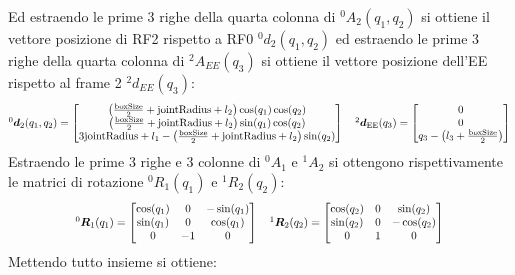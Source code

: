 ﻿\documentclass[11pt, a4paper]{article}
\begin{document}
Ed estraendo le prime 3 righe della quarta colonna di ${}^{0}A_{2}(q_{1}, q_{2})$ si ottiene il vettore posizione di RF2 rispetto a RF0 ${}^{0}d_{2}(q_1, q_2)$ ed estraendo le prime 3 righe della quarta colonna di ${}^{2}A_{EE}(q_{3})$ si ottiene il vettore posizione dell'EE rispetto al frame 2 ${}^{2}d_{EE}(q_3)$:
\[
\scalebox{0.8}{$
^{0}\bm{d}_{2}(q_{1}, q_{2}) =
\begin{bmatrix}
    \left(\frac{\text{boxSize}}{2} + \text{jointRadius} + l_2\right)\cos(q_1)\cos(q_2) \\
    \left(\frac{\text{boxSize}}{2} + \text{jointRadius} + l_2\right)\sin(q_1)\cos(q_2) \\
    3\text{jointRadius} + l_1 - \left(\frac{\text{boxSize}}{2} + \text{jointRadius} + l_2\right)\sin(q_2) \\
\end{bmatrix}
\quad
^{2}\bm{d}_{\text{EE}}(q_{3}) =
\begin{bmatrix}
    0\\
    0\\
    q_{3} - \left(l_{3} + \frac{\text{boxSize}}{2}\right)\\
\end{bmatrix}
$}
\]
Estraendo le prime 3 righe e 3 colonne di ${}^{0}A_{1}$ e ${}^{1}A_{2}$ si ottengono rispettivamente le matrici di rotazione ${}^{0}R_{1}(q_1)$ e ${}^{1}R_{2}(q_2)$:
\[
\scalebox{0.8}{$
^{0}\bm{R}_{1}(q_{1}) =
\begin{bmatrix}
    \cos(q_1) & 0 & -\sin(q_1) \\
    \sin(q_1) & 0 & \cos(q_1) \\
    0 & -1 & 0 \\
\end{bmatrix}
\quad
^{1}\bm{R}_{2}(q_{2}) =
\begin{bmatrix}
    \cos(q_2) & 0 & \sin(q_2) \\
    \sin(q_2) & 0 & -\cos(q_2) \\
    0 & 1 & 0 \\
\end{bmatrix}
$}
\]
Mettendo tutto insieme si ottiene:
\end{document}
